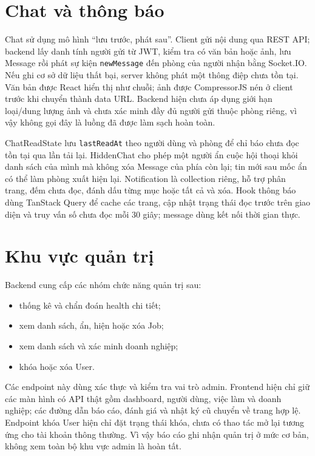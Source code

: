 \section{Chat và thông báo}

Chat sử dụng mô hình ``lưu trước, phát sau''. Client gửi nội dung qua REST API; backend lấy danh tính người gửi từ JWT, kiểm tra có văn bản hoặc ảnh, lưu Message rồi phát sự kiện \texttt{newMessage} đến phòng của người nhận bằng Socket.IO. Nếu ghi cơ sở dữ liệu thất bại, server không phát một thông điệp chưa tồn tại. Văn bản được React hiển thị như chuỗi; ảnh được CompressorJS nén ở client trước khi chuyển thành data URL. Backend hiện chưa áp dụng giới hạn loại/dung lượng ảnh và chưa xác minh đầy đủ người gửi thuộc phòng riêng, vì vậy không gọi đây là luồng đã được làm sạch hoàn toàn.

ChatReadState lưu \texttt{lastReadAt} theo người dùng và phòng để chỉ báo chưa đọc tồn tại qua lần tải lại. HiddenChat cho phép một người ẩn cuộc hội thoại khỏi danh sách của mình mà không xóa Message của phía còn lại; tin mới sau mốc ẩn có thể làm phòng xuất hiện lại. Notification là collection riêng, hỗ trợ phân trang, đếm chưa đọc, đánh dấu từng mục hoặc tất cả và xóa. Hook thông báo dùng TanStack Query để cache các trang, cập nhật trạng thái đọc trước trên giao diện và truy vấn số chưa đọc mỗi 30 giây; message dùng kết nối thời gian thực.

\section{Khu vực quản trị}

Backend cung cấp các nhóm chức năng quản trị sau:

\begin{itemize}
    \item thống kê và chẩn đoán health chi tiết;
    \item xem danh sách, ẩn, hiện hoặc xóa Job;
    \item xem danh sách và xác minh doanh nghiệp;
    \item khóa hoặc xóa User.
\end{itemize}

Các endpoint này dùng xác thực và kiểm tra vai trò admin. Frontend hiện chỉ giữ các màn hình có API thật gồm dashboard, người dùng, việc làm và doanh nghiệp; các đường dẫn báo cáo, đánh giá và nhật ký cũ chuyển về trang hợp lệ. Endpoint khóa User hiện chỉ đặt trạng thái khóa, chưa có thao tác mở lại tương ứng cho tài khoản thông thường. Vì vậy báo cáo ghi nhận quản trị ở mức cơ bản, không xem toàn bộ khu vực admin là hoàn tất.

